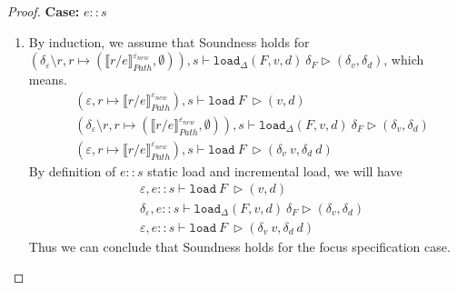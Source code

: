 \documentclass[10pt,twoside,a4paper]{article}
\theoremstyle{theorem}
\theoremstyle{lemma}
\theoremstyle{property}
\theoremstyle{definition}
\theoremstyle{assumption}
\begin{document}
\begin{proof}
	\textbf{Case: } $e::s$\\
	\begin{enumerate}
	\item 
	By induction, we assume that Soundness holds for $(\delta_\varepsilon \setminus r, r \mapsto (\llbracket r/e \rrbracket^{\varepsilon_{new}}_{Path}, \emptyset)) , s \vdash \mathtt{load}_\Delta (F,v,d)~ \delta_F \rhd (\delta_v,\delta_d)$, which means.
	\begin{align*}
			& (\varepsilon, r \mapsto \llbracket r/e \rrbracket^{\varepsilon_{new}}_{Path}), s \vdash \mathtt{load}~ F~ \rhd (v,d)\\
			& (\delta_\varepsilon \setminus r, r \mapsto (\llbracket r/e \rrbracket^{\varepsilon_{new}}_{Path}, \emptyset)) , s \vdash \mathtt{load}_\Delta (F,v,d)~ \delta_F \rhd (\delta_v,\delta_d)\\
			& (\varepsilon, r \mapsto \llbracket r/e \rrbracket^{\varepsilon_{new}}_{Path}), s \vdash \mathtt{load}~ F~ \rhd (\delta_v~v,\delta_d~d)
	\end{align*}
	By definition of $e::s$ static load and incremental load, we will have
	\begin{align*}
			& \varepsilon, e::s \vdash \mathtt{load}~ F~ \rhd (v,d)\\
			& \delta_\varepsilon, e::s \vdash \mathtt{load}_\Delta (F,v,d)~ \delta_F \rhd (\delta_v,\delta_d)\\
			& \varepsilon, e::s \vdash \mathtt{load}~ F~ \rhd (\delta_v~v,\delta_d~d)
	\end{align*}
	Thus we can conclude that Soundness holds for the focus specification case.
	\end{enumerate}
	

\end{proof}
\end{document}
